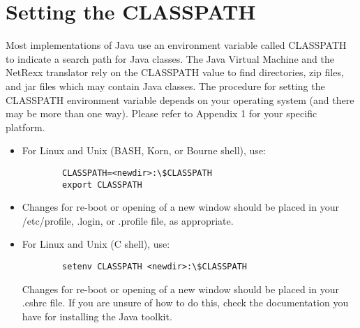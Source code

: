 \section{Setting the CLASSPATH}
Most implementations of Java use an environment variable called CLASSPATH to indicate a search path for Java classes. The Java Virtual Machine and the NetRexx translator rely on the CLASSPATH value to find directories, zip files, and jar files which may contain Java classes. 
The procedure for setting the CLASSPATH environment variable depends on your operating system (and there may be more than one way). Please refer to Appendix 1 for your specific platform.
\begin{itemize}
\item For Linux and Unix (BASH, Korn, or Bourne shell), use:
\begin{verbatim}
        CLASSPATH=<newdir>:\$CLASSPATH 
        export CLASSPATH
\end{verbatim}

\item Changes for re-boot or opening of a new window should be placed in your /etc/profile, .login, or .profile file, as appropriate. 
\item For Linux and Unix (C shell), use:
\begin{verbatim}
        setenv CLASSPATH <newdir>:\$CLASSPATH 
\end{verbatim}
Changes for re-boot or opening of a new window should be placed in your .cshrc file. If you are unsure of how to do this, check the documentation you have for installing the Java toolkit. 
\end{itemize}

